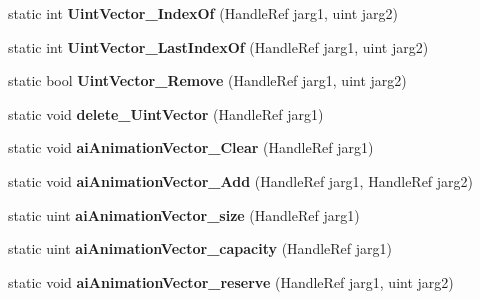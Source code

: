 \begin{DoxyCompactItemize}
\item 
\hypertarget{class_assimp_p_i_n_v_o_k_e_a035e38b0dfeaff869175363f3d228ef4}{static int {\bfseries Uint\+Vector\+\_\+\+Index\+Of} (Handle\+Ref jarg1, uint jarg2)}\label{class_assimp_p_i_n_v_o_k_e_a035e38b0dfeaff869175363f3d228ef4}

\item 
\hypertarget{class_assimp_p_i_n_v_o_k_e_aa81a08f5475c41169e9e06968463731b}{static int {\bfseries Uint\+Vector\+\_\+\+Last\+Index\+Of} (Handle\+Ref jarg1, uint jarg2)}\label{class_assimp_p_i_n_v_o_k_e_aa81a08f5475c41169e9e06968463731b}

\item 
\hypertarget{class_assimp_p_i_n_v_o_k_e_a254668d0f77aca91a73d1b468cd4ca80}{static bool {\bfseries Uint\+Vector\+\_\+\+Remove} (Handle\+Ref jarg1, uint jarg2)}\label{class_assimp_p_i_n_v_o_k_e_a254668d0f77aca91a73d1b468cd4ca80}

\item 
\hypertarget{class_assimp_p_i_n_v_o_k_e_a6ef313debdfdfa05949ca56eee976210}{static void {\bfseries delete\+\_\+\+Uint\+Vector} (Handle\+Ref jarg1)}\label{class_assimp_p_i_n_v_o_k_e_a6ef313debdfdfa05949ca56eee976210}

\item 
\hypertarget{class_assimp_p_i_n_v_o_k_e_ab55ce75659d349d6a69f7822e31b74d8}{static void {\bfseries ai\+Animation\+Vector\+\_\+\+Clear} (Handle\+Ref jarg1)}\label{class_assimp_p_i_n_v_o_k_e_ab55ce75659d349d6a69f7822e31b74d8}

\item 
\hypertarget{class_assimp_p_i_n_v_o_k_e_ad0a3343862e4533df0ba093654629069}{static void {\bfseries ai\+Animation\+Vector\+\_\+\+Add} (Handle\+Ref jarg1, Handle\+Ref jarg2)}\label{class_assimp_p_i_n_v_o_k_e_ad0a3343862e4533df0ba093654629069}

\item 
\hypertarget{class_assimp_p_i_n_v_o_k_e_aa9bb4fdcef43593c80548ad4f4345f42}{static uint {\bfseries ai\+Animation\+Vector\+\_\+size} (Handle\+Ref jarg1)}\label{class_assimp_p_i_n_v_o_k_e_aa9bb4fdcef43593c80548ad4f4345f42}

\item 
\hypertarget{class_assimp_p_i_n_v_o_k_e_aaaff30eb2ae6cbe5ced439e4b9b300e7}{static uint {\bfseries ai\+Animation\+Vector\+\_\+capacity} (Handle\+Ref jarg1)}\label{class_assimp_p_i_n_v_o_k_e_aaaff30eb2ae6cbe5ced439e4b9b300e7}

\item 
\hypertarget{class_assimp_p_i_n_v_o_k_e_a7fbe6404e3d63104e991877eaf2c47bf}{static void {\bfseries ai\+Animation\+Vector\+\_\+reserve} (Handle\+Ref jarg1, uint jarg2)}\label{class_assimp_p_i_n_v_o_k_e_a7fbe6404e3d63104e991877eaf2c47bf}


\end{DoxyCompactItemize}
